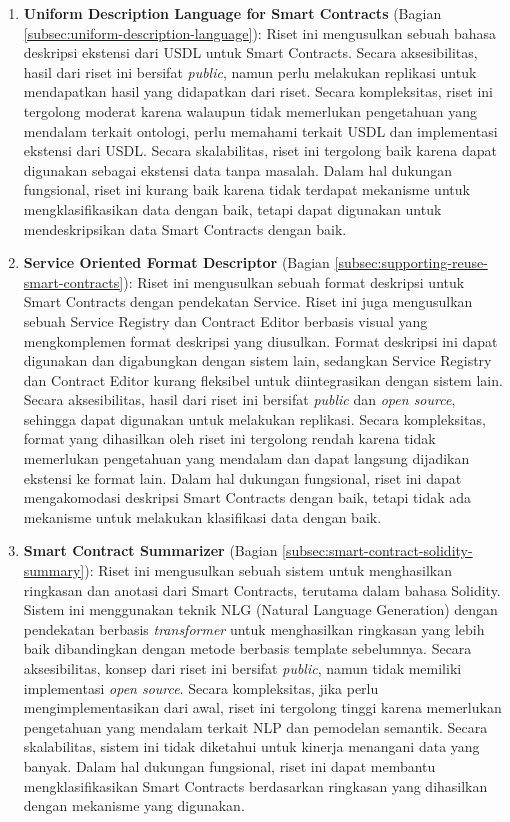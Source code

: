 \begin{enumerate}
	\item \textbf{Uniform Description Language for Smart Contracts} \parencite{udlsc} (Bagian \ref{subsec:uniform-description-language}): Riset ini mengusulkan sebuah bahasa deskripsi ekstensi dari USDL untuk Smart Contracts. Secara aksesibilitas, hasil dari riset ini bersifat \textit{public}, namun perlu melakukan replikasi untuk mendapatkan hasil yang didapatkan dari riset. Secara kompleksitas, riset ini tergolong moderat karena walaupun tidak memerlukan pengetahuan yang mendalam terkait ontologi, perlu memahami terkait USDL dan implementasi ekstensi dari USDL. Secara skalabilitas, riset ini tergolong baik karena dapat digunakan sebagai ekstensi data tanpa masalah. Dalam hal dukungan fungsional, riset ini kurang baik karena tidak terdapat mekanisme untuk mengklasifikasikan data dengan baik, tetapi dapat digunakan untuk mendeskripsikan data Smart Contracts dengan baik.

	\item \textbf{Service Oriented Format Descriptor} \parencite{guida2019supporting} (Bagian \ref{subsec:supporting-reuse-smart-contracts}): Riset ini mengusulkan sebuah format deskripsi untuk Smart Contracts dengan pendekatan Service. Riset ini juga mengusulkan sebuah Service Registry dan Contract Editor berbasis visual yang mengkomplemen format deskripsi yang diusulkan. Format deskripsi ini dapat digunakan dan digabungkan dengan sistem lain, sedangkan Service Registry dan Contract Editor kurang fleksibel untuk diintegrasikan dengan sistem lain. Secara aksesibilitas, hasil dari riset ini bersifat \textit{public} dan \textit{open source}, sehingga dapat digunakan untuk melakukan replikasi. Secara kompleksitas, format yang dihasilkan oleh riset ini tergolong rendah karena tidak memerlukan pengetahuan yang mendalam dan dapat langsung dijadikan ekstensi ke format lain. Dalam hal dukungan fungsional, riset ini dapat mengakomodasi deskripsi Smart Contracts dengan baik, tetapi tidak ada mekanisme untuk melakukan klasifikasi data dengan baik.

	\item \textbf{Smart Contract Summarizer} \parencite{zhang2021smart} (Bagian \ref{subsec:smart-contract-solidity-summary}): Riset ini mengusulkan sebuah sistem untuk menghasilkan ringkasan dan anotasi dari Smart Contracts, terutama dalam bahasa Solidity. Sistem ini menggunakan teknik NLG (Natural Language Generation) dengan pendekatan berbasis \textit{transformer} untuk menghasilkan ringkasan yang lebih baik dibandingkan dengan metode berbasis template sebelumnya. Secara aksesibilitas, konsep dari riset ini bersifat \textit{public}, namun tidak memiliki implementasi \textit{open source}. Secara kompleksitas, jika perlu mengimplementasikan dari awal, riset ini tergolong tinggi karena memerlukan pengetahuan yang mendalam terkait NLP dan pemodelan semantik. Secara skalabilitas, sistem ini tidak diketahui untuk kinerja menangani data yang banyak. Dalam hal dukungan fungsional, riset ini dapat membantu mengklasifikasikan Smart Contracts berdasarkan ringkasan yang dihasilkan dengan mekanisme yang digunakan.

\end{enumerate}
